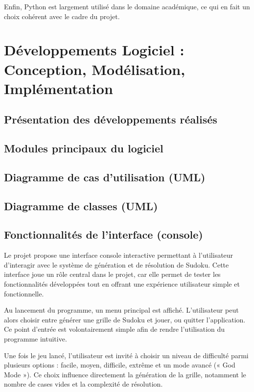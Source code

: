 \documentclass[a4paper]{article}
\begin{document}
Enfin, Python est largement utilisé dans le domaine académique, ce qui en fait un choix cohérent avec le cadre du projet.


\section{Développements Logiciel : Conception, Modélisation, Implémentation}

\subsection{Présentation des développements réalisés}

\subsection{Modules principaux du logiciel}

\subsection{Diagramme de cas d’utilisation (UML)}

\subsection{Diagramme de classes (UML)}

\subsection{Fonctionnalités de l’interface (console)}
Le projet propose une interface console interactive permettant à l’utilisateur d’interagir avec le système de génération et de résolution de Sudoku. Cette interface joue un rôle central dans le projet, car elle permet de tester les fonctionnalités développées tout en offrant une expérience utilisateur simple et fonctionnelle.

Au lancement du programme, un menu principal est affiché. L’utilisateur peut alors choisir entre générer une grille de Sudoku et jouer, ou quitter l’application. Ce point d’entrée est volontairement simple afin de rendre l’utilisation du programme intuitive.

Une fois le jeu lancé, l’utilisateur est invité à choisir un niveau de difficulté parmi plusieurs options : facile, moyen, difficile, extrême et un mode avancé (« God Mode »). Ce choix influence directement la génération de la grille, notamment le nombre de cases vides et la complexité de résolution.
\end{document}
